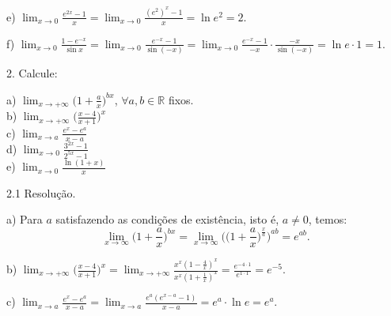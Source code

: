 \documentclass{article}
\begin{document}
{\begin{newpage}
\par
\vspace{0.3cm}
e) $\displaystyle{\lim_{x\to 0} \frac{e^{2x} - 1}{x} = \lim_{x\to 0} \frac{(e^{2})^{x} - 1}{x} = \ln{e^2} = 2}$.
\par
\vspace{0.3cm}
f) $\displaystyle{\lim_{x\to 0} \frac{1 - e^{-x}}{\sin{x}} = \lim_{x\to 0} \frac{e^{-x} - 1}{\sin{(-x)}} = \lim_{x\to 0} \frac{e^{-x} - 1}{-x}\cdot\frac{-x}{\sin{(-x)}} = \ln{e}\cdot1 = 1}$.
\par
\vspace{0.3cm}
\begin{flushleft}
2. Calcule:
\end{flushleft}
\par
\begin{multicols}{2}
\hspace{-15pt}a) $\displaystyle{\lim_{x\to +\infty }} \Big(1 + \frac{a}{x}\Big)^{bx}$, $\forall a,b \in\mathbb{R}$ fixos. \\
b) $\displaystyle{\lim_{x\to +\infty }} \Big(\frac{x-4}{x+1}\Big)^x$\\
c) $\displaystyle{\lim_{x\to a}} \frac{e^x - e^a}{x-a}$\\
d) $\displaystyle{\lim_{x\to 0}} \frac{3^{2x} - 1}{2^{5x} - 1}$\\
e) $\displaystyle{\lim_{x\to 0}} \frac{\ln{(1+x)}}{x}$
\end{multicols}
\par
\begin{flushleft}
2.1 Resolução.
\end{flushleft}
\par
a) Para $a$ satisfazendo as condições de existência, isto é, $a\neq 0$, temos:
\begin{equation*} \displaystyle{\lim_{x\to\infty }} \Big(1 + \frac{a}{x}\Big)^{bx} = \displaystyle{\lim_{x\to\infty }} \Big(\Big(1 + \frac{a}{x}\Big)^{\frac{x}{a}}\Big)^{ab} = e^{ab}.\end{equation*}
\par
\vspace{0.3cm}
b) $\displaystyle{\lim_{x\to +\infty } \Big(\frac{x-4}{x+1}\Big)^x = \lim_{x\to +\infty } \frac{x^{x}(1 - \frac{4}{x})^x}{x^{x}(1 + \frac{1}{x})^x} = \frac{e^{-4\cdot1}}{e^{1\cdot1}} = e^{-5}}$.
\par
\vspace{0.3cm}
c) $\displaystyle{\lim_{x\to a} \frac{e^x - e^a}{x-a} = \lim_{x\to a} \frac{e^{a}(e^{x-a} - 1)}{x-a} = e^{a}\cdot\ln{e} = e^a}$.
\par

\end{newpage}}
\end{document}
